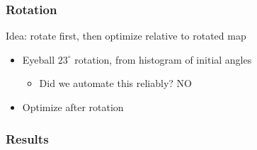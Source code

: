 \documentclass[12pt,t,xcolor=dvipsnames]{beamer}
\begin{document}
\begin{frame}
  \frametitle{Rotation}

  Idea: rotate first, then optimize relative to rotated map
  \begin{itemize}
  \item Eyeball $23^\circ$ rotation, from histogram of initial angles
    \begin{itemize}
    \item Did we automate this reliably? NO
    \end{itemize}
  \item Optimize after rotation
  \end{itemize}

\end{frame}

\begin{frame}
  \frametitle{Results}


  

\end{frame}
\end{document}
